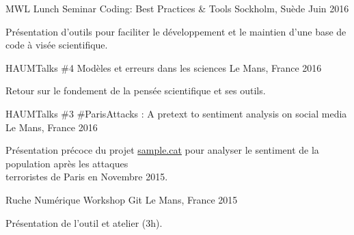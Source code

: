 

\begin{cventries}

  \cventry
    {MWL Lunch Seminar} %
		{Coding: Best Practices \& Tools} %
    {Sockholm, Suède} %
    {Juin 2016} %
    {
      \begin{cvitems} %
        \item {Présentation d'outils pour faciliter le développement et le maintien d'une
					base de code à visée scientifique.}
      \end{cvitems}
    }

  \cventry
		{HAUMTalks \#4} %
    {Modèles et erreurs dans les sciences} %
    {Le Mans, France} %
    {2016} %
    {
      \begin{cvitems} %
			\item {Retour sur le fondement de la pensée scientifique et ses outils.}
      \end{cvitems}
    }

  \cventry
		{HAUMTalks \#3} %
    {\#ParisAttacks : A pretext to sentiment analysis on social media} %
    {Le Mans, France} %
    {2016} %
    {
      \begin{cvitems} %
			\item {Présentation précoce du projet \href{https://sample.cat}{sample.cat} pour
				analyser le sentiment de la population après les attaques\\ terroristes de Paris en
				Novembre 2015.}
      \end{cvitems}
    }

  \cventry
    {Ruche Numérique} %
    {Workshop Git} %
    {Le Mans, France} %
    {2015} %
    {
      \begin{cvitems} %
			\item {Présentation de l'outil et atelier (3h).}
      \end{cvitems}
    }


\end{cventries}
